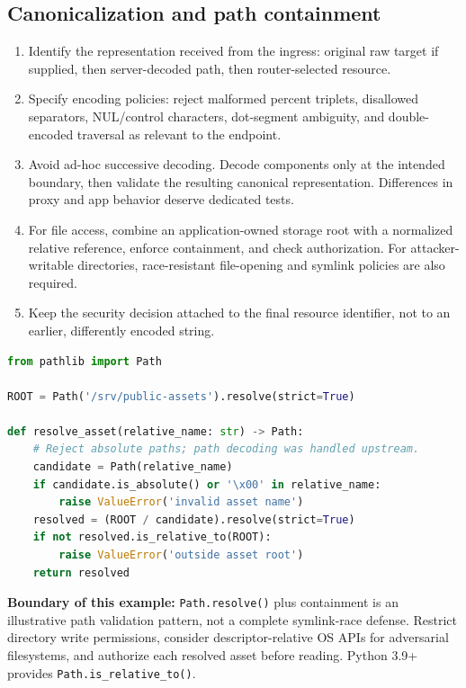 \documentclass[10pt,letterpaper,oneside]{article}
\newcommand{\code}[1]{\texttt{#1}}
\begin{document}
\subsection{Canonicalization and path containment}
\begin{enumerate}
\item Identify the representation received from the ingress: original raw target if supplied, then server-decoded path, then router-selected resource.
\item Specify encoding policies: reject malformed percent triplets, disallowed separators, NUL/control characters, dot-segment ambiguity, and double-encoded traversal as relevant to the endpoint.
\item Avoid ad-hoc successive decoding. Decode components only at the intended boundary, then validate the resulting canonical representation. Differences in proxy and app behavior deserve dedicated tests.
\item For file access, combine an application-owned storage root with a normalized relative reference, enforce containment, and check authorization. For attacker-writable directories, race-resistant file-opening and symlink policies are also required.
\item Keep the security decision attached to the final resource identifier, not to an earlier, differently encoded string.
\end{enumerate}
\begin{lstlisting}[language=Python,caption={Illustration: validated path containment for a read-only repository}]
from pathlib import Path

ROOT = Path('/srv/public-assets').resolve(strict=True)

def resolve_asset(relative_name: str) -> Path:
    # Reject absolute paths; path decoding was handled upstream.
    candidate = Path(relative_name)
    if candidate.is_absolute() or '\x00' in relative_name:
        raise ValueError('invalid asset name')
    resolved = (ROOT / candidate).resolve(strict=True)
    if not resolved.is_relative_to(ROOT):
        raise ValueError('outside asset root')
    return resolved
\end{lstlisting}
\textbf{Boundary of this example:} \code{Path.resolve()} plus containment is an illustrative path validation pattern, not a complete symlink-race defense. Restrict directory write permissions, consider descriptor-relative OS APIs for adversarial filesystems, and authorize each resolved asset before reading. Python 3.9+ provides \code{Path.is\_relative\_to()}.
\end{document}
